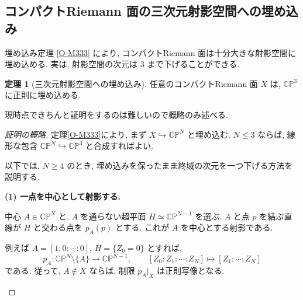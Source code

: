 \documentclass[dvipdfmx,a4paper,11pt]{article} %
\newcommand{\C}{\mathbb{C}}
\theoremstyle{definition}
\newtheorem{thm}{定理}[section]
\numberwithin{equation}{section}
\begin{document}
\subsection{コンパクトRiemann 面の三次元射影空間への埋め込み}

埋め込み定理 \ref{O-M333} により, 
コンパクトRiemann 面は十分大きな射影空間に埋め込める.
実は, 射影空間の次元は $3$ まで下げることができる.


\begin{thm}[三次元射影空間への埋め込み]\label{thm-embedding-p3}
任意のコンパクトRiemann 面 $X$ は,
$\C\mathbb P^3$ に正則に埋め込める.
\end{thm}

現時点できちんと証明をするのは難しいので概略のみ述べる. 
\begin{proof}[証明の概略]
定理\ref{O-M333}により,
まず $X\hookrightarrow\C\mathbb P^N$ と埋め込む.
$N\leq3$ ならば,
線形な包含 $\C\mathbb P^N\hookrightarrow\C\mathbb P^3$
と合成すればよい.

以下では, $N\geq4$ のとき,
埋め込みを保ったまま終域の次元を一つ下げる方法を説明する.

\medskip
\noindent
\textbf{(1) 一点を中心として射影する.}

中心 $A\in\C\mathbb P^N$ と,
$A$ を通らない超平面 $H\simeq\C\mathbb P^{N-1}$ を選ぶ.
$A$ と点 $p$ を結ぶ直線が $H$ と交わる点を $p_A(p)$ とする.
これが $A$ を中心とする射影である.

例えば $A=[1:0:\cdots:0]$, $H=\{Z_0=0\}$ とすれば,
\[
p_A:\C\mathbb P^N\setminus\{A\}
\longrightarrow\C\mathbb P^{N-1},
\qquad
[Z_0:Z_1:\cdots:Z_N]\longmapsto[Z_1:\cdots:Z_N]
\]
である.
従って, $A\notin X$ ならば,
制限 $p_A|_X$ は正則写像となる.

\begin{figure}[htbp]
\centering
{}
\end{figure}
\end{proof}
\end{document}
